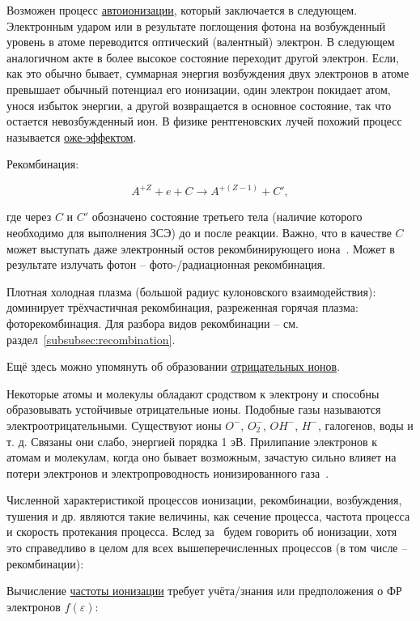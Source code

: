 \documentclass[10pt, a4paper]{article}
\begin{document}
Возможен процесс \uline{автоионизации}, который заключается в следующем.
Электронным ударом или в результате поглощения фотона на возбужденный уровень в атоме переводится оптический (валентный) электрон. В следующем аналогичном акте в более высокое состояние переходит другой электрон. Если, как это обычно бывает, суммарная энергия возбуждения двух электронов в атоме превышает обычный потенциал его ионизации, один электрон покидает атом, унося избыток энергии, а другой возвращается в основное состояние, так что остается невозбужденный ион. В физике рентгеновских лучей похожий процесс называется \uline{оже-эффектом}.

Рекомбинация:

\begin{equation}
	A^{+Z} + e + C \rightarrow A^{+(Z-1)} + C',
\end{equation}

где через $C$ и $C'$ обозначено состояние третьего тела (наличие которого необходимо для выполнения ЗСЭ) до и после реакции. Важно, что в качестве $C$ может выступать даже электронный остов рекомбинирующего иона~\cite{astap}. Может в результате излучать фотон -- фото-/радиационная рекомбинация.

Плотная холодная плазма (большой радиус кулоновского взаимодействия): доминирует трёхчастичная рекомбинация, разреженная горячая плазма: фоторекомбинация. Для разбора видов рекомбинации -- см. раздел~\ref{subsubsec:recombination}.

Ещё здесь можно упомянуть об образовании \uline{отрицательных ионов}.

Некоторые атомы и молекулы обладают сродством к электрону и способны образовывать устойчивые отрицательные ионы. Подобные газы называются электроотрицательными. Существуют ионы $O^{-}$, $O_2^{-}$, $OH^{-}$, $H^{-}$, галогенов, воды и т. д. Связаны они слабо, энергией порядка 1 эВ. Прилипание электронов к атомам и молекулам, когда оно бывает возможным, зачастую сильно влияет на потери электронов и электропроводность ионизированного газа~\cite{raizer}.

Численной характеристикой процессов ионизации, рекомбинации, возбуждения, тушения и др. являются такие величины, как сечение процесса, частота процесса и скорость протекания процесса. Вслед за~\cite{raizer} будем говорить об ионизации, хотя это справедливо в целом для всех вышеперечисленных процессов (в том числе -- рекомбинации):

Вычисление \uline{частоты ионизации} требует учёта/знания или предположения о ФР электронов $f(\varepsilon)$:
\end{document}
